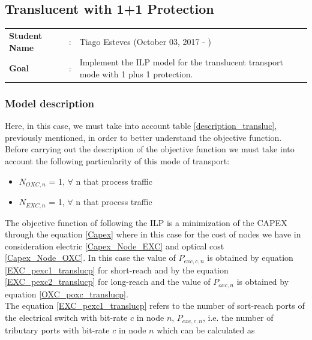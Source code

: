 \clearpage

\subsection{Translucent with 1+1 Protection}\label{ILP_Transluc_Protection}
\begin{tcolorbox}	
\begin{tabular}{p{2.75cm} p{0.2cm} p{10.5cm}} 	
\textbf{Student Name}  &:& Tiago Esteves    (October 03, 2017 - )\\
\textbf{Goal}          &:& Implement the ILP model for the translucent transport mode with 1 plus 1 protection.
\end{tabular}
\end{tcolorbox}

\subsubsection{Model description}

Here, in this case, we must take into account table \ref{description_transluc}, previously mentioned, in order to better understand the objective function.\\

Before carrying out the description of the objective function we must take into account the following particularity of this mode of transport:
\begin{itemize}
  \item $N_{OXC,n}$ = 1, \quad $\forall$ n that process traffic
  \item $N_{EXC,n}$ = 1, \quad $\forall$ n that process traffic
\end{itemize}

\vspace{11pt}
The objective function of following the ILP is a minimization of the CAPEX through the equation \ref{Capex} where in this case for the cost of nodes we have in consideration electric \ref{Capex_Node_EXC} and optical cost \ref{Capex_Node_OXC}. In this case the value of $P_{exc,c,n}$ is obtained by equation \ref{EXC_pexc1_translucp} for short-reach and by the equation \ref{EXC_pexc2_translucp} for long-reach and the value of $P_{oxc,n}$ is obtained by equation \ref{OXC_poxc_translucp}.\\

The equation \ref{EXC_pexc1_translucp} refers to the number of sort-reach ports of the electrical switch with bit-rate $c$ in node $n$, $P_{exc,c,n}$, i.e. the number of tributary ports with bit-rate $c$ in node $n$ which can be calculated as


